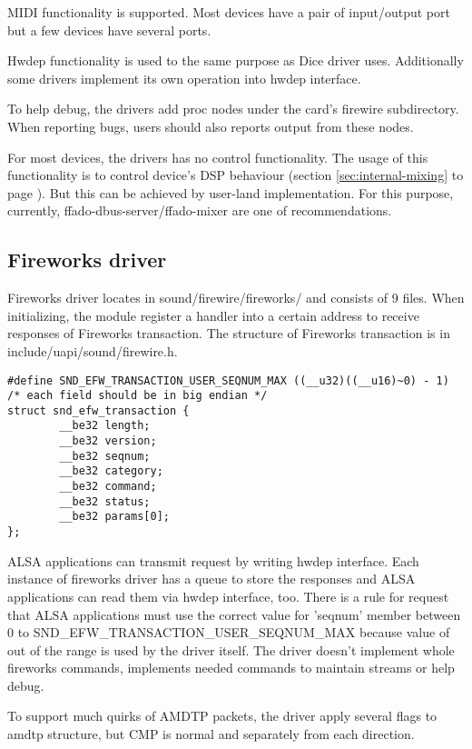 \documentclass[onecolumn]{article}
\begin{document}
MIDI functionality is supported. Most devices have a pair of input/output port but a few devices have several ports.

Hwdep functionality is used to the same purpose as Dice driver uses. Additionally some drivers implement its own operation into hwdep interface.

To help debug, the drivers add proc nodes under the card's firewire subdirectory. When reporting bugs, users should also reports output from these nodes.

For most devices, the drivers has no control functionality. The usage of this functionality is to control device's DSP behaviour (section \ref{sec:internal-mixing} to page \pageref{sec:internal-mixing}). But this can be achieved by user-land implementation. For this purpose, currently, ffado-dbus-server/ffado-mixer are one of recommendations.


\subsection{Fireworks driver}

Fireworks driver locates in sound/firewire/fireworks/ and consists of 9 files. When initializing, the module register a handler into a certain address to receive responses of Fireworks transaction. The structure of Fireworks transaction is in include/uapi/sound/firewire.h.

\begin{verbatim}
#define SND_EFW_TRANSACTION_USER_SEQNUM_MAX	((__u32)((__u16)~0) - 1)
/* each field should be in big endian */
struct snd_efw_transaction {
        __be32 length;
        __be32 version;
        __be32 seqnum;
        __be32 category;
        __be32 command;
        __be32 status;
        __be32 params[0];
};
\end{verbatim}

ALSA applications can transmit request by writing hwdep interface. Each instance of fireworks driver has a queue to store the responses and ALSA applications can read them via hwdep interface, too. There is a rule for request that ALSA applications must use the correct value for 'seqnum' member between 0 to SND\_EFW\_TRANSACTION\_USER\_SEQNUM\_MAX because value of out of the range is used by the driver itself. The driver doesn't implement whole fireworks commands, implements needed commands to maintain streams or help debug.

To support much quirks of AMDTP packets, the driver apply several flags to amdtp structure, but CMP is normal and separately from each direction. 
\end{document}
